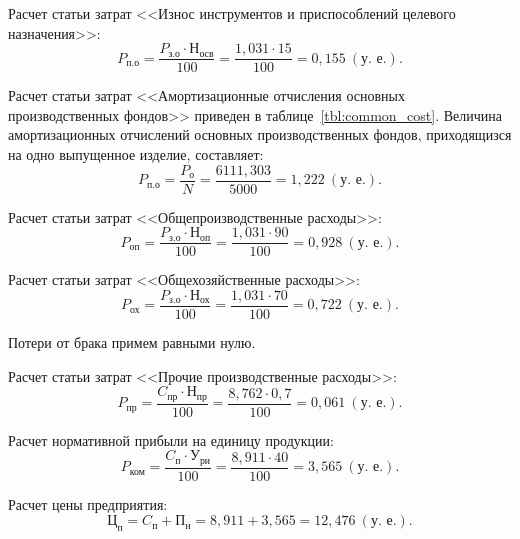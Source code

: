 Расчет статьи затрат 
<<Износ инструментов и приспособлений целевого назначения>>:
\begin{equation*}
P_{\text{п.о}} = 
\dfrac{
  P_{\text{з.о}} \cdot \text{Н}_{\text{осв}}
}{
  100
} =
\dfrac{1{,}031 \cdot 15}{100} =
0{,}155 \: (\text{у.~е.}).
\end{equation*}

Расчет статьи затрат 
<<Амортизационные отчисления основных производственных фондов>> 
приведен в таблице~\ref{tbl:common_cost}.
Величина амортизационных отчислений основных производственных фондов,
приходящизся на одно выпущенное изделие, составляет: 
\begin{equation*}
P_{\text{п.о}} = 
\dfrac{
  P_{о}
}{
  N
} =
\dfrac{6111{,}303}{5000} =
1{,}222 \: (\text{у.~е.}).
\end{equation*}

Расчет статьи затрат 
<<Общепроизводственные расходы>>:
\begin{equation*}
P_{\text{оп}} = 
\dfrac{
  P_{\text{з.о}} \cdot \text{Н}_{\text{оп}}
}{
  100
} =
\dfrac{1{,}031 \cdot 90}{100} =
0{,}928 \: (\text{у.~е.}).
\end{equation*}

Расчет статьи затрат 
<<Общехозяйственные расходы>>:
\begin{equation*}
P_{\text{ох}} = 
\dfrac{
  P_{\text{з.о}} \cdot \text{Н}_{\text{ох}}
}{
  100
} =
\dfrac{1{,}031 \cdot 70}{100} =
0{,}722 \: (\text{у.~е.}).
\end{equation*}

Потери от брака примем равными нулю.

Расчет статьи затрат 
<<Прочие производственные расходы>>:
\begin{equation*}
P_{\text{пр}} = 
\dfrac{
  C_{\text{пр}} \cdot \text{Н}_{\text{пр}}
}{
  100
} =
\dfrac{8{,}762 \cdot 0{,}7}{100} =
0{,}061 \: (\text{у.~е.}).
\end{equation*}

Расчет нормативной прибыли на единицу продукции:
\begin{equation*}
P_{\text{ком}} = 
\dfrac{
  C_{\text{п}} \cdot \text{У}_{\text{ри}}
}{
  100
} =
\dfrac{8{,}911 \cdot 40}{100} =
3{,}565 \: (\text{у.~е.}).
\end{equation*}

Расчет цены предприятия:
\begin{equation*}
\text{Ц}_{\text{п}} = 
C_{\text{п}} + \text{П}_{\text{н}} =
8{,}911 + 3{,}565 =
12{,}476 \: (\text{у.~е.}).
\end{equation*}

